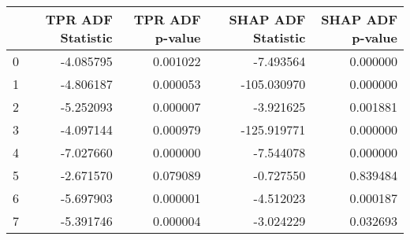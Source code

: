 \begin{tabular}{lrrrr}
\toprule
 & TPR ADF Statistic & TPR ADF p-value & SHAP ADF Statistic & SHAP ADF p-value \\
\midrule
0 & -4.085795 & 0.001022 & -7.493564 & 0.000000 \\
1 & -4.806187 & 0.000053 & -105.030970 & 0.000000 \\
2 & -5.252093 & 0.000007 & -3.921625 & 0.001881 \\
3 & -4.097144 & 0.000979 & -125.919771 & 0.000000 \\
4 & -7.027660 & 0.000000 & -7.544078 & 0.000000 \\
5 & -2.671570 & 0.079089 & -0.727550 & 0.839484 \\
6 & -5.697903 & 0.000001 & -4.512023 & 0.000187 \\
7 & -5.391746 & 0.000004 & -3.024229 & 0.032693 \\
\bottomrule
\end{tabular}
